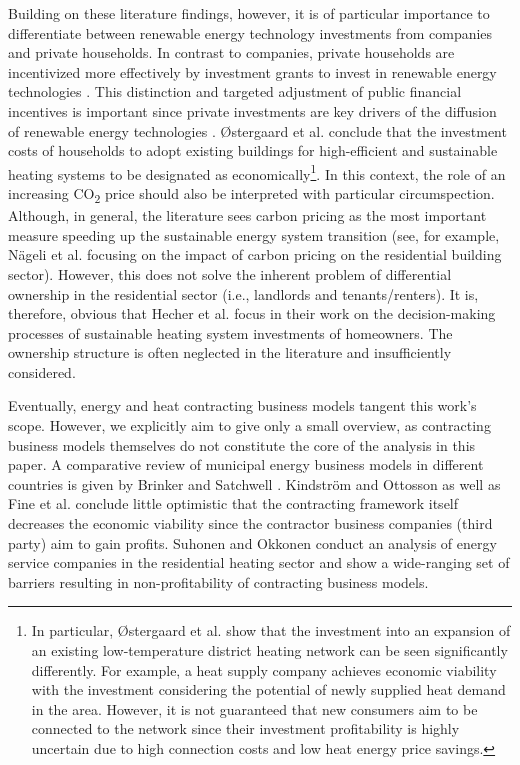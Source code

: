 Building on these literature findings, however, it is of particular importance to differentiate between renewable energy technology investments from companies and private households. In contrast to companies, private households are incentivized more effectively by investment grants to invest in renewable energy technologies \cite{roth2020impact}. This distinction and targeted adjustment of public financial incentives is important since private investments are key drivers of the diffusion of renewable energy technologies \cite{wustenhagen2012strategic}. {\O}stergaard et al. \cite{ostergaard2019costs} conclude that the investment costs of households to adopt existing buildings for high-efficient and sustainable heating systems to be designated as economically\footnote{In particular, {\O}stergaard et al. \cite{ostergaard2019costs} show that the investment into an expansion of an existing low-temperature district heating network can be seen significantly differently. For example, a heat supply company achieves economic viability with the investment considering the potential of newly supplied heat demand in the area. However, it is not guaranteed that new consumers aim to be connected to the network since their investment profitability is highly uncertain due to high connection costs and low heat energy price savings.}. In this context, the role of an increasing CO\textsubscript{2} price should also be interpreted with particular circumspection. Although, in general, the literature sees carbon pricing as the most important measure speeding up the sustainable energy system transition (see, for example, Nägeli et al. \cite{nageli2020policies} focusing on the impact of carbon pricing on the residential building sector). However, this does not solve the inherent problem of differential ownership in the residential sector (i.e., landlords and tenants/renters). It is, therefore, obvious that Hecher et al. \cite{hecher2017trigger} focus in their work on the decision-making processes of sustainable heating system investments of homeowners. The ownership structure is often neglected in the literature and insufficiently considered.\vspace{0.5cm} 

Eventually, energy and heat contracting business models tangent this work's scope. However, we explicitly aim to give only a small overview, as contracting business models themselves do not constitute the core of the analysis in this paper. A comparative review of municipal energy business models in different countries is given by Brinker and Satchwell \cite{brinker2020comparative}. Kindström and Ottosson \cite{kindstrom2016local} as well as Fine et al. \cite{fina2020profitability} conclude little optimistic that the contracting framework itself decreases the economic viability since the contractor business companies (third party) aim to gain profits. Suhonen and Okkonen \cite{suhonen2013energy} conduct an analysis of energy service companies in the residential heating sector and show a wide-ranging set of barriers resulting in non-profitability of contracting business models.

